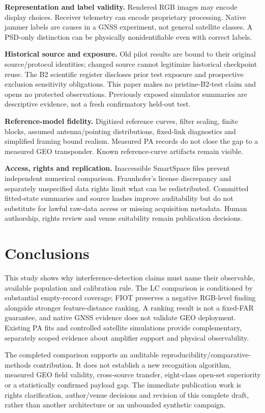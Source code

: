 \documentclass[
  10pt,
]{article}
\begin{document}
\textbf{Representation and label validity.} Rendered RGB images may
encode display choices. Receiver telemetry can encode proprietary
processing. Native jammer labels are causes in a GNSS experiment, not
general satellite classes. A PSD-only distinction can be physically
nonidentifiable even with correct labels.

\textbf{Historical source and exposure.} Old pilot results are bound to
their original source/protocol identities; changed source cannot
legitimize historical checkpoint reuse. The B2 scientific register
discloses prior test exposure and prospective exclusion sensitivity
obligations. This paper makes no pristine-B2-test claim and opens no
protected observations. Previously exposed simulator summaries are
descriptive evidence, not a fresh confirmatory held-out test.

\textbf{Reference-model fidelity.} Digitized reference curves, filter
scaling, finite blocks, assumed antenna/pointing distributions,
fixed-link diagnostics and simplified framing bound realism. Measured PA
records do not close the gap to a measured GEO transponder. Known
reference-curve artifacts remain visible.

\textbf{Access, rights and replication.} Inaccessible SmartSpace files
prevent independent numerical comparison. Fraunhofer's license
discrepancy and separately unspecified data rights limit what can be
redistributed. Committed fitted-state summaries and source hashes
improve auditability but do not substitute for lawful raw-data access or
missing acquisition metadata. Human authorship, rights review and venue
suitability remain publication decisions.

\section{Conclusions}\label{conclusions}

This study shows why interference-detection claims must name their
observable, available population and calibration rule. The LC comparison
is conditioned by substantial empty-record coverage; FIOT preserves a
negative RGB-level finding alongside stronger feature-distance ranking.
A ranking result is not a fixed-FAR guarantee, and native GNSS evidence
does not validate GEO deployment. Existing PA fits and controlled
satellite simulations provide complementary, separately scoped evidence
about amplifier support and physical observability.

The completed comparison supports an auditable
reproducibility/comparative-methods contribution. It does not establish
a new recognition algorithm, measured GEO field validity, cross-source
transfer, eight-class open-set superiority or a statistically confirmed
payload gap. The immediate publication work is rights clarification,
author/venue decisions and revision of this complete draft, rather than
another architecture or an unbounded synthetic campaign.
\end{document}
